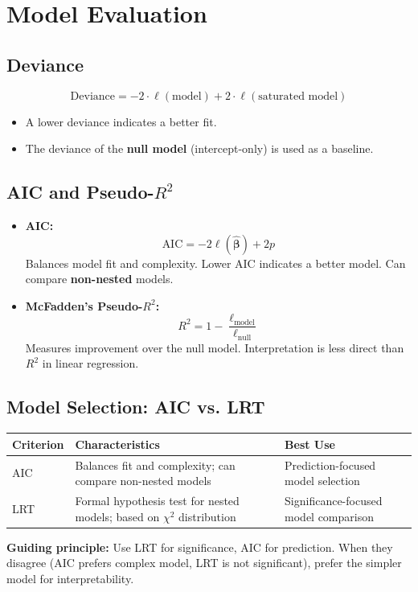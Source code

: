 \documentclass{article}
\begin{document}
\section{Model Evaluation}

\subsection{Deviance}
$$\text{Deviance} = -2 \cdot \ell(\text{model}) + 2 \cdot \ell(\text{saturated model})$$
\begin{itemize}
    \item A lower deviance indicates a better fit.
    \item The deviance of the \textbf{null model} (intercept-only) is used as a baseline.
\end{itemize}

\subsection{AIC and Pseudo-$R^2$}
\begin{itemize}
    \item \textbf{AIC:}
    $$\text{AIC} = -2\ell(\hat{\boldsymbol{\beta}}) + 2p$$
    Balances model fit and complexity. Lower AIC indicates a better model. Can compare \textbf{non-nested} models.
    \item \textbf{McFadden's Pseudo-$R^2$:}
    $$R^2 = 1 - \frac{\ell_{\text{model}}}{\ell_{\text{null}}}$$
    Measures improvement over the null model. Interpretation is less direct than $R^2$ in linear regression.
\end{itemize}

\subsection{Model Selection: AIC vs. LRT}
\begin{table}[h]
\centering
\small
\begin{tabularx}{\textwidth}{>{\raggedright\arraybackslash}p{}
                            >{\raggedright\arraybackslash}p{}
                            >{\raggedright\arraybackslash}X}
\toprule
\textbf{Criterion} & \textbf{Characteristics} & \textbf{Best Use} \\ 
\midrule
AIC & Balances fit and complexity; can compare non-nested models & Prediction-focused model selection \\
LRT & Formal hypothesis test for nested models; based on $\chi^2$ distribution & Significance-focused model comparison \\
\bottomrule
\end{tabularx}
\end{table}
\noindent\textbf{Guiding principle:} Use LRT for significance, AIC for prediction. When they disagree (AIC prefers complex model, LRT is not significant), prefer the simpler model for interpretability.
\end{document}
